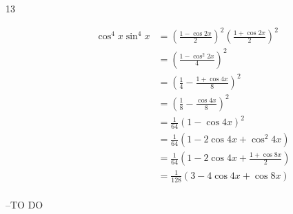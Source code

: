 \documentclass{exam}
\begin{document}
\begin{description}
      \item[13]
        \begin{align*}
          \cos^4 x \sin^4 x & = \left( \frac{1 - \cos 2x}{2} \right)^2 \left( \frac{1 + \cos 2x}{2} \right)^2 \\
                            & = \left( \frac{1 - \cos^2 2x}{4} \right)^2 \\
                            & = \left( \frac{1}{4} - \frac{1 + \cos 4x}{8} \right)^2 \\
                            & = \left( \frac{1}{8} - \frac{\cos 4x}{8} \right)^2 \\
                            & = \frac{1}{64} \left( 1 - \cos 4x \right)^2 \\
                            & = \frac{1}{64} \left( 1 - 2 \cos 4x + \cos^2 4x \right) \\
                            & = \frac{1}{64} \left( 1 - 2 \cos 4x + \frac{1 + \cos 8x}{2} \right) \\
                            & = \frac{1}{128} \left( 3 - 4 \cos 4x + \cos 8x \right) \\
        \end{align*}

    \end{description}

  \else
    \vspace{5 cm}

    \begin{quote}
      \begin{em}
      \end{em}
    \end{quote}
    \hspace{1 cm} --TO DO
  \fi
\end{document}

